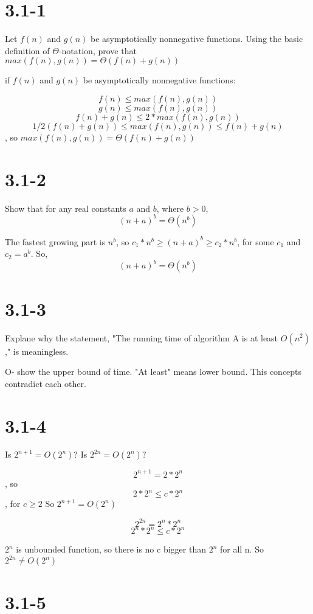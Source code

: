 \documentclass{article}
\begin{document}
\section*{3.1-1} 

Let $f(n)$ and $g(n)$ be asymptotically nonnegative functions. Using the basic definition of $\Theta$-notation, prove that $max(f(n), g(n)) = \Theta(f(n)+g(n))$

if $f(n)$ and $g(n)$ be asymptotically nonnegative functions:

\[ f(n) \le max(f(n), g(n)) \]
\[ g(n) \le max(f(n), g(n)) \]
\[ f(n) + g(n)  \le 2*max(f(n), g(n)) \]
\[ 1/2(f(n) + g(n))  \le max(f(n), g(n)) \le f(n) + g(n)\], 
so $max(f(n), g(n)) = \Theta(f(n)+g(n))$ 

\section*{3.1-2}

Show that for any real constants $a$ and $b$, where $b>0$,
\[ (n+a)^b = \Theta(n^b) \]
 
The fastest growing part is $n^b$, so $c_1*n^b \ge (n+a)^b \ge c_2*n^b$, for some $c_1$ and $c_2=a^b$. 
So,
\[ (n+a)^b = \Theta(n^b) \]

\section*{3.1-3}

Explane why the statement, "The running time of algorithm A is at least $O(n^2)$," is meaningless.

O- show the upper bound of time. "At least" means lower bound. This concepts contradict each other.

\section*{3.1-4}

Is $2^{n+1}=O(2^n)$? Is $2^{2n} = O(2^n)$?

\[ 2^{n+1} = 2*2^n \], so 
\[ 2*2^n \le c*2^n\], for $c \ge 2$
So  $2^{n+1}=O(2^n)$


\[ 2^{2n} = 2^n*2^n \]
\[ 2^n*2^n \le c*2^n \]

$2^n$ is unbounded function, so there is no c bigger than $2^n$ for all n. So  $2^{2n} \ne O(2^n)$

\section*{3.1-5}
\end{document}
